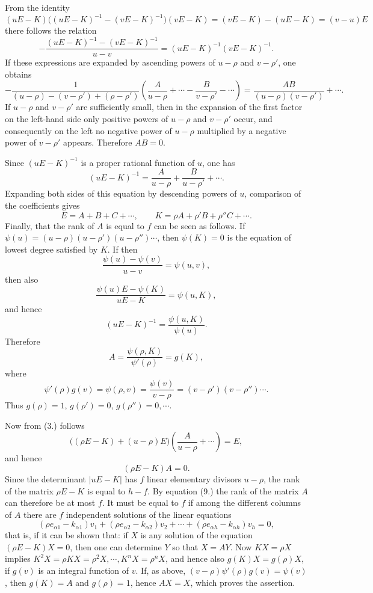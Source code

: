 \documentclass[11pt]{article}
\begin{document}
From the identity
\[
(uE-K)\bigl((uE-K)^{-1}-(vE-K)^{-1}\bigr)(vE-K)=(vE-K)-(uE-K)=(v-u)E
\]
there follows the relation
\[
-\frac{(uE-K)^{-1}-(vE-K)^{-1}}{u-v}=(uE-K)^{-1}(vE-K)^{-1}.
\]
If these expressions are expanded by ascending powers of $u-\rho$ and $v-\rho'$, one obtains
\[
-\frac{1}{(u-\rho)-(v-\rho')+(\rho-\rho')}
\left(\frac{A}{u-\rho}+\cdots-\frac{B}{v-\rho'}-\cdots\right)
=\frac{AB}{(u-\rho)(v-\rho')}+\cdots.
\]
If $u-\rho$ and $v-\rho'$ are sufficiently small, then in the expansion of the first factor on the left-hand side only positive powers of $u-\rho$ and $v-\rho'$ occur, and consequently on the left no negative power of $u-\rho$ multiplied by a negative power of $v-\rho'$ appears. Therefore $AB=0$.

Since $(uE-K)^{-1}$ is a proper rational function of $u$, one has
\begin{equation}\tag{7.}
(uE-K)^{-1}=\frac{A}{u-\rho}+\frac{B}{u-\rho'}+\cdots.
\end{equation}
Expanding both sides of this equation by descending powers of $u$, comparison of the coefficients gives
\begin{equation}\tag{8.}
E=A+B+C+\cdots,
\qquad
K=\rho A+\rho'B+\rho''C+\cdots.
\end{equation}
Finally, that the rank of $A$ is equal to $f$ can be seen as follows. If $\psi(u)=(u-\rho)(u-\rho')(u-\rho'')\cdots$, then $\psi(K)=0$ is the equation of lowest degree satisfied by $K$. If then
\[
\frac{\psi(u)-\psi(v)}{u-v}=\psi(u,v),
\]
then also
\[
\frac{\psi(u)E-\psi(K)}{uE-K}=\psi(u,K),
\]
and hence
\[
(uE-K)^{-1}=\frac{\psi(u,K)}{\psi(u)}.
\]
Therefore
\[
A=\frac{\psi(\rho,K)}{\psi'(\rho)}=g(K),
\]
where
\[
\psi'(\rho)g(v)=\psi(\rho,v)=\frac{\psi(v)}{v-\rho}=(v-\rho')(v-\rho'')\cdots.
\]
Thus $g(\rho)=1$, $g(\rho')=0$, $g(\rho'')=0,\cdots$.

Now from (3.) follows
\[
\bigl((\rho E-K)+(u-\rho)E\bigr)\left(\frac{A}{u-\rho}+\cdots\right)=E,
\]
and hence
\begin{equation}\tag{9.}
(\rho E-K)A=0.
\end{equation}
Since the determinant $|uE-K|$ has $f$ linear elementary divisors $u-\rho$, the rank of the matrix $\rho E-K$ is equal to $h-f$. By equation (9.) the rank of the matrix $A$ can therefore be at most $f$. It must be equal to $f$ if among the different columns of $A$ there are $f$ independent solutions of the linear equations
\[
(\rho e_{\alpha1}-k_{\alpha1})v_1+(\rho e_{\alpha2}-k_{\alpha2})v_2+\cdots+(\rho e_{\alpha h}-k_{\alpha h})v_h=0,
\]
that is, if it can be shown that: if $X$ is any solution of the equation $(\rho E-K)X=0$, then one can determine $Y$ so that $X=AY$. Now $KX=\rho X$ implies $K^2X=\rho KX=\rho^2X,\cdots,K^nX=\rho^nX$, and hence also $g(K)X=g(\rho)X$, if $g(v)$ is an integral function of $v$. If, as above, $(v-\rho)\psi'(\rho)g(v)=\psi(v)$, then $g(K)=A$ and $g(\rho)=1$, hence $AX=X$, which proves the assertion.
\end{document}
